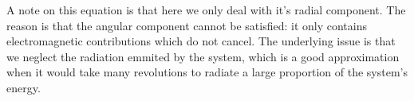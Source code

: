 \documentclass[11pt,a4paper]{article}
\begin{document}
A note on this equation is that here we only deal with it's radial component. The reason is that the angular component cannot be satisfied: it only contains electromagnetic contributions which do not cancel. The underlying issue is that we neglect the radiation emmited by the system, which is a good approximation when it would take many revolutions to radiate a large proportion of the system's energy.
\end{document}
